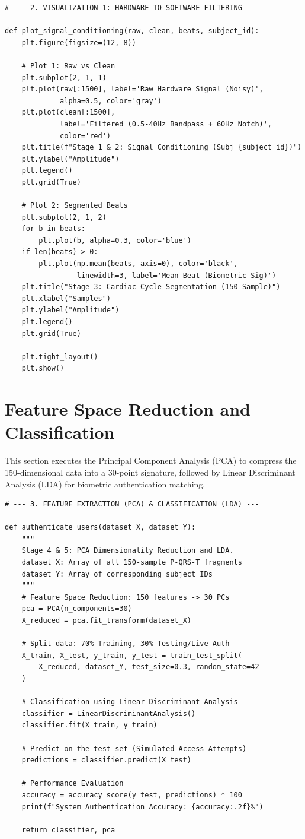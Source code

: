 \documentclass[12pt,a4paper]{report}
\begin{document}
\begin{verbatim}
# --- 2. VISUALIZATION 1: HARDWARE-TO-SOFTWARE FILTERING ---

def plot_signal_conditioning(raw, clean, beats, subject_id):
    plt.figure(figsize=(12, 8))
    
    # Plot 1: Raw vs Clean 
    plt.subplot(2, 1, 1)
    plt.plot(raw[:1500], label='Raw Hardware Signal (Noisy)', 
             alpha=0.5, color='gray')
    plt.plot(clean[:1500], 
             label='Filtered (0.5-40Hz Bandpass + 60Hz Notch)', 
             color='red')
    plt.title(f"Stage 1 & 2: Signal Conditioning (Subj {subject_id})")
    plt.ylabel("Amplitude")
    plt.legend()
    plt.grid(True)

    # Plot 2: Segmented Beats 
    plt.subplot(2, 1, 2)
    for b in beats:
        plt.plot(b, alpha=0.3, color='blue')
    if len(beats) > 0:
        plt.plot(np.mean(beats, axis=0), color='black', 
                 linewidth=3, label='Mean Beat (Biometric Sig)')
    plt.title("Stage 3: Cardiac Cycle Segmentation (150-Sample)")
    plt.xlabel("Samples")
    plt.ylabel("Amplitude")
    plt.legend()
    plt.grid(True)
    
    plt.tight_layout()
    plt.show()
\end{verbatim}

\section{Feature Space Reduction and Classification}
This section executes the Principal Component Analysis (PCA) to compress the 150-dimensional data into a 30-point signature, followed by Linear Discriminant Analysis (LDA) for biometric authentication matching.

\begin{verbatim}
# --- 3. FEATURE EXTRACTION (PCA) & CLASSIFICATION (LDA) ---

def authenticate_users(dataset_X, dataset_Y):
    """
    Stage 4 & 5: PCA Dimensionality Reduction and LDA.
    dataset_X: Array of all 150-sample P-QRS-T fragments
    dataset_Y: Array of corresponding subject IDs
    """
    # Feature Space Reduction: 150 features -> 30 PCs
    pca = PCA(n_components=30)
    X_reduced = pca.fit_transform(dataset_X)
    
    # Split data: 70% Training, 30% Testing/Live Auth
    X_train, X_test, y_train, y_test = train_test_split(
        X_reduced, dataset_Y, test_size=0.3, random_state=42
    )
    
    # Classification using Linear Discriminant Analysis
    classifier = LinearDiscriminantAnalysis()
    classifier.fit(X_train, y_train)
    
    # Predict on the test set (Simulated Access Attempts)
    predictions = classifier.predict(X_test)
    
    # Performance Evaluation
    accuracy = accuracy_score(y_test, predictions) * 100
    print(f"System Authentication Accuracy: {accuracy:.2f}%")
    
    return classifier, pca
\end{verbatim}
\end{document}
